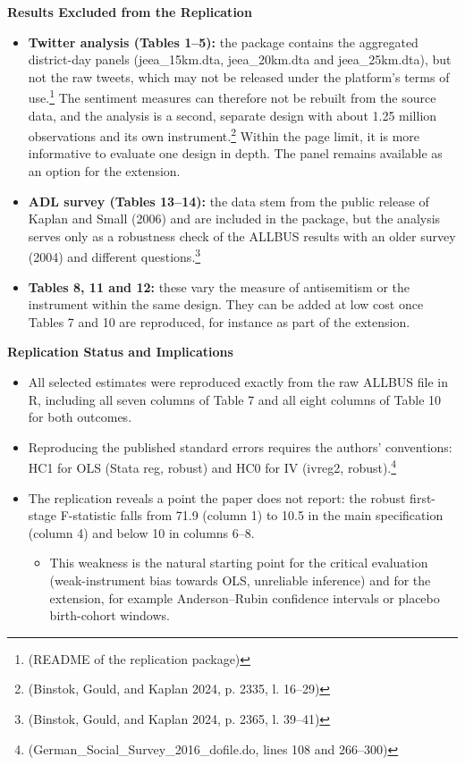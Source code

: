 \par\textbf{Results Excluded from the Replication}\par

\begin{itemize}
\item
  \textbf{Twitter analysis (Tables 1--5):} the package contains the aggregated district-day panels (jeea\_15km.dta, jeea\_20km.dta and jeea\_25km.dta), but not the raw tweets, which may not be released under the platform's terms of use.\footnote{(README of the replication package)} The sentiment measures can therefore not be rebuilt from the source data, and the analysis is a second, separate design with about 1.25 million observations and its own instrument.\footnote{(Binstok, Gould, and Kaplan 2024, p. 2335, l. 16--29)} Within the page limit, it is more informative to evaluate one design in depth. The panel remains available as an option for the extension.
\item
  \textbf{ADL survey (Tables 13--14):} the data stem from the public release of Kaplan and Small (2006) and are included in the package, but the analysis serves only as a robustness check of the ALLBUS results with an older survey (2004) and different questions.\footnote{(Binstok, Gould, and Kaplan 2024, p. 2365, l. 39--41)}
\item
  \textbf{Tables 8, 11 and 12:} these vary the measure of antisemitism or the instrument within the same design. They can be added at low cost once Tables 7 and 10 are reproduced, for instance as part of the extension.
\end{itemize}

\par\textbf{Replication Status and Implications}\par

\begin{itemize}
\item
  All selected estimates were reproduced exactly from the raw ALLBUS file in R, including all seven columns of Table 7 and all eight columns of Table 10 for both outcomes.
\item
  Reproducing the published standard errors requires the authors' conventions: HC1 for OLS (Stata reg, robust) and HC0 for IV (ivreg2, robust).\footnote{(German\_Social\_Survey\_2016\_dofile.do, lines 108 and 266--300)}
\item
  The replication reveals a point the paper does not report: the robust first-stage F-statistic falls from 71.9 (column 1) to 10.5 in the main specification (column 4) and below 10 in columns 6--8.

  \begin{itemize}
  \item
    This weakness is the natural starting point for the critical evaluation (weak-instrument bias towards OLS, unreliable inference) and for the extension, for example Anderson--Rubin confidence intervals or placebo birth-cohort windows.
  \end{itemize}
\end{itemize}

